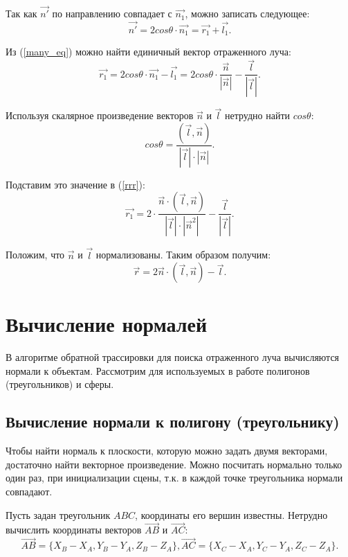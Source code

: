 Так как $\vec{n'}$ по направлению совпадает с $\vec{n_1}$, можно записать следующее:
\begin{equation}\label{many_eq}
	\vec{n'} = 2cos\theta \cdot \vec{n_1} = \vec{r_1} + \vec{l_1}.
\end{equation}

Из (\ref{many_eq}) можно найти единичный вектор отраженного луча:
\begin{equation}\label{rrr}
	\vec{r_1} = 2cos\theta \cdot \vec{n_1} - \vec{l_1} = 2cos\theta \cdot \frac{\vec{n}}{|\vec{n}|} - \frac{\vec{l}}{|\vec{l}|}.
\end{equation}

Используя скалярное произведение векторов $\vec{n}$ и $\vec{l}$ нетрудно найти $cos\theta$:
\begin{equation}
	cos\theta = \frac{(\vec{l}, \vec{n})}{|\vec{l}| \cdot |\vec{n}|}.
\end{equation}

Подставим это значение в (\ref{rrr}):
\begin{equation}
	\vec{r_1} = 2 \cdot \frac{\vec{n} \cdot (\vec{l}, \vec{n})}{|\vec{l}| \cdot |\vec{n}^2|} - \frac{\vec{l}}{|\vec{l}|}.
\end{equation}

Положим, что $\vec{n}$ и $\vec{l}$ нормализованы. Таким образом получим:
\begin{equation}
	\vec{r} = 2\vec{n} \cdot (\vec{l}, \vec{n}) - \vec{l}.
\end{equation}

\section{Вычисление нормалей}

В алгоритме обратной трассировки для поиска отраженного луча вычисляются нормали к объектам. Рассмотрим для используемых в работе полигонов (треугольников) и сферы.

\subsection{Вычисление нормали к полигону (треугольнику)}

Чтобы найти нормаль к плоскости, которую можно задать двумя векторами, достаточно найти векторное произведение. Можно посчитать нормально только один раз, при инициализации сцены, т.к. в каждой точке треугольника нормали совпадают.

Пусть задан треугольник $ABC$, координаты его вершин известны. Нетрудно вычислить координаты векторов $\vec{AB}$ и $\vec{AC}$:
\begin{equation}
	\vec{AB} = \{X_B - X_A, Y_B - Y_A, Z_B - Z_A\}, \vec{AC} = \{X_C - X_A, Y_C - Y_A, Z_C - Z_A\}.
\end{equation}

